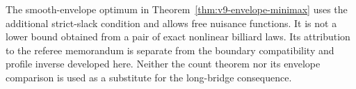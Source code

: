 The smooth-envelope optimum in Theorem~\ref{thm:v9-envelope-minimax}
uses the additional strict-slack condition and allows free nuisance
functions. It is not a lower bound obtained from a pair of exact
nonlinear billiard laws. Its attribution to the referee memorandum is
separate from the boundary compatibility and profile inverse developed
here. Neither the count theorem nor its envelope comparison is used
as a substitute for the long-bridge consequence.
